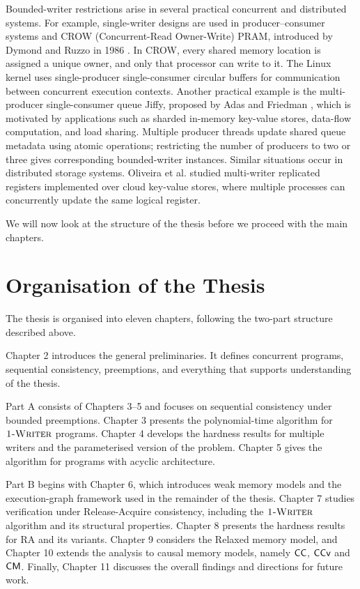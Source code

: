 Bounded-writer restrictions arise in several practical concurrent and distributed systems. For example, single-writer designs are used in producer–consumer systems and CROW (Concurrent-Read Owner-Write) PRAM, introduced by Dymond and Ruzzo in 1986 \cite{Dymond86}. In CROW, every shared memory location is assigned a unique owner, and only that processor can write to it. The Linux kernel uses single-producer single-consumer circular buffers for communication between concurrent execution  contexts. Another practical example is the multi-producer single-consumer queue Jiffy, proposed by Adas and Friedman \cite{adas2020jiffy}, which is motivated by applications such as sharded in-memory key-value stores, data-flow computation, and load sharing. Multiple producer threads update shared queue metadata using atomic operations; restricting the number of producers to two or three gives corresponding bounded-writer instances. Similar situations occur in distributed storage systems. Oliveira et al. \cite{oliveira_et_al:LIPIcs.OPODIS.2016.30} studied multi-writer replicated registers implemented over cloud key-value stores, where multiple processes can concurrently update the same logical register.




We will now look at the structure of the thesis before we proceed with the main chapters.


\section{Organisation of the Thesis}

The thesis is organised into eleven chapters, following the two-part structure described above.

Chapter 2 introduces the general  preliminaries. It defines concurrent programs, sequential consistency, preemptions, and everything that supports understanding of the thesis.  

Part A consists of Chapters 3–5 and focuses on sequential consistency under bounded preemptions. Chapter 3 presents the polynomial-time algorithm for $\textsc{1-Writer}$ programs. Chapter 4 develops the hardness results for multiple writers and the parameterised version of the problem. Chapter 5 gives the algorithm for programs with acyclic architecture.

Part B begins with Chapter 6, which introduces weak memory models and the execution-graph framework used in the remainder of the thesis. Chapter 7 studies verification under Release-Acquire consistency, including the $\textsc{1-Writer}$ algorithm and its structural properties. Chapter 8 presents the hardness results for RA and its variants. Chapter 9 considers the Relaxed memory model, and Chapter 10 extends the analysis to causal memory models, namely $\mathsf{CC}$, $\mathsf{CCv}$ and $\mathsf{CM}$. Finally, Chapter 11 discusses the overall findings and directions for future work.


